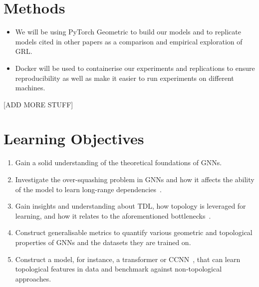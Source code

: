 \documentclass[a4paper,12pt]{article}
\begin{document}
\section{Methods}
\begin{itemize}
	\item  We will be using PyTorch Geometric to build our models and to replicate models cited in other papers as a comparison and empirical exploration of GRL.
	\item Docker will be used to containerise our experiments and replications to ensure reproducibility as well as make it easier to run experiments on different machines.
\end{itemize}



[ADD MORE STUFF]
\section{Learning Objectives}


\begin{enumerate}
	\item Gain a solid understanding of the theoretical foundations of GNNs.
	\item Investigate the over-squashing problem in GNNs and how it affects the ability of the model to learn long-range dependencies~\cite{alon_bottleneck_2021}.
	\item Gain insights and understanding about TDL, how topology is leveraged for learning, and how it relates to the aforementioned bottlenecks~\cite{horn_topological_2022}.
	\item Construct generalisable metrics to quantify various geometric and topological properties of GNNs and the datasets they are trained on.
	\item Construct a model, for instance, a transformer or CCNN~\cite{tdlbook}, that can learn topological features in data and benchmark against non-topological approaches.
\end{enumerate}

\printbibliography
\end{document}
